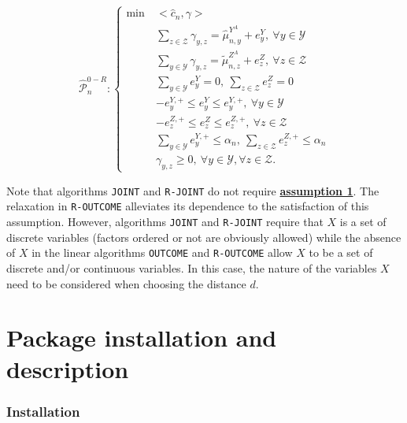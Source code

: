\begin{equation}
\widehat{\mathcal{P}}^{0-R}_n:    \left\{
 \begin{aligned}
      \min\: & <\widehat{c}_n,\gamma>\\
         & \sum_{z\in \mathcal{Z}} \gamma_{y,z} = \hat{\mu}^{Y^A}_{n,y} + e^{Y}_{y}, \:\forall y\in \mathcal{Y}\\
         & \sum_{y\in \mathcal{Y}} \gamma_{y,z} = \tilde{\mu}^{Z^A}_{n,z} + e^{Z}_{z}, \:\forall z\in \mathcal{Z}\\
         & \sum_{y\in \mathcal{Y}} e^{Y}_{y} = 0,\: \sum_{z\in \mathcal{Z}} e^{Z}_z = 0\\
         & -e^{Y,+}_{y}\leq e^{Y}_{y} \leq e^{Y,+}_{y}, \:\forall y\in \mathcal{Y}\\
         & -e^{Z,+}_{z}\leq e^{Z}_{z} \leq e^{Z,+}_{z}, \:\forall z\in \mathcal{Z}\\
         & \sum_{y\in \mathcal{Y}} e^{Y,+}_{y} \leq \alpha_n,\: \sum_{z\in \mathcal{Z}} e^{Z,+}_{z} \leq \alpha_n\\
         & \gamma_{y,z} \geq 0,  \:\forall y\in \mathcal{Y}, \forall z\in \mathcal{Z}.
 \end{aligned}\right.
\label{eq:modeloutcomerelaxed}
\end{equation}

Note that algorithms \texttt{JOINT} and \texttt{R-JOINT} do not require \protect\hyperlink{optt}{\textbf{assumption 1}}. The relaxation in \texttt{R-OUTCOME} alleviates its dependence to the satisfaction of this assumption. However, algorithms \texttt{JOINT} and \texttt{R-JOINT} require that \(X\) is a set of discrete variables (factors ordered or not are obviously allowed) while the absence of \(X\) in the linear algorithms \texttt{OUTCOME} and \texttt{R-OUTCOME} allow \(X\) to be a set of discrete and/or continuous variables. In this case, the nature of the variables \(X\) need to be considered when choosing the distance \(d\).

\hypertarget{package-installation-and-description}{%
\section{Package installation and description}\label{package-installation-and-description}}

\hypertarget{installation}{%
\subsubsection{Installation}\label{installation}}

